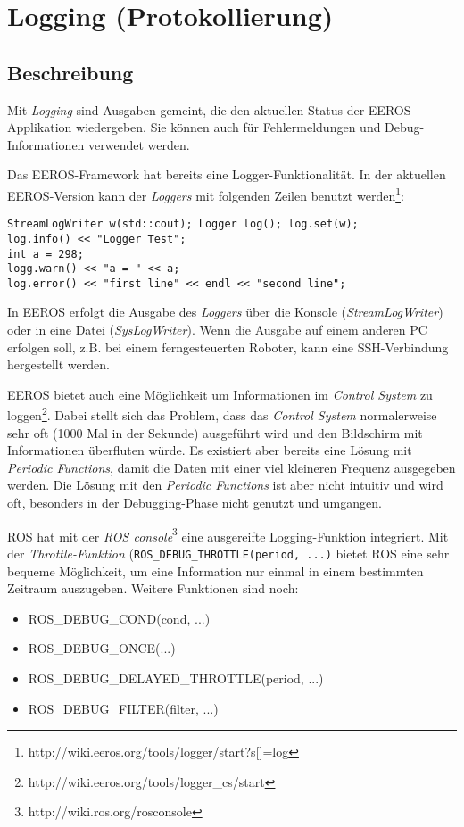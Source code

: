 \section{Logging (Protokollierung)}
\subsection{Beschreibung}
Mit \textit{Logging} sind Ausgaben gemeint, die den aktuellen Status der EEROS-Applikation wiedergeben.
Sie können auch für Fehlermeldungen und Debug-Informationen verwendet werden.

Das EEROS-Framework hat bereits eine Logger-Funktionalität.
In der aktuellen EEROS-Version kann der \textit{Loggers}  mit folgenden Zeilen benutzt werden\footnote{http://wiki.eeros.org/tools/logger/start?s[]=log}:
\lstset{language=C++}
\begin{lstlisting}
StreamLogWriter w(std::cout); Logger log(); log.set(w);
log.info() << "Logger Test";
int a = 298;
logg.warn() << "a = " << a;
log.error() << "first line" << endl << "second line"; 
\end{lstlisting}

In EEROS erfolgt die Ausgabe des \textit{Loggers} über die Konsole (\textit{StreamLogWriter}) oder in eine Datei (\textit{SysLogWriter}).
Wenn die Ausgabe auf einem anderen PC erfolgen soll, z.B. bei einem ferngesteuerten Roboter, kann eine SSH-Verbindung hergestellt werden.

EEROS bietet auch eine Möglichkeit um Informationen im \textit{Control System} zu loggen\footnote{http://wiki.eeros.org/tools/logger\_cs/start}.
Dabei stellt sich das Problem, dass das \textit{Control System} normalerweise sehr oft (1000 Mal in der Sekunde) ausgeführt wird und den Bildschirm mit Informationen überfluten würde.
Es existiert aber bereits eine Lösung mit \textit{Periodic Functions}, damit die Daten mit einer viel kleineren Frequenz ausgegeben werden.
Die Lösung mit den \textit{Periodic Functions} ist aber nicht intuitiv und wird oft, besonders in der Debugging-Phase nicht genutzt und umgangen.

ROS hat mit der \textit{ROS console}\footnote{http://wiki.ros.org/rosconsole} eine ausgereifte Logging-Funktion integriert.
Mit der \textit{Throttle-Funktion} (\texttt{ROS\_DEBUG\_THROTTLE(period, ...)} bietet ROS eine sehr bequeme Möglichkeit, um eine Information nur einmal in einem bestimmten Zeitraum auszugeben.
Weitere Funktionen sind noch:

\begin{itemize}
\item ROS\_DEBUG\_COND(cond, ...)
\item ROS\_DEBUG\_ONCE(...)
\item ROS\_DEBUG\_DELAYED\_THROTTLE(period, ...)
\item ROS\_DEBUG\_FILTER(filter, ...)
\end{itemize}

